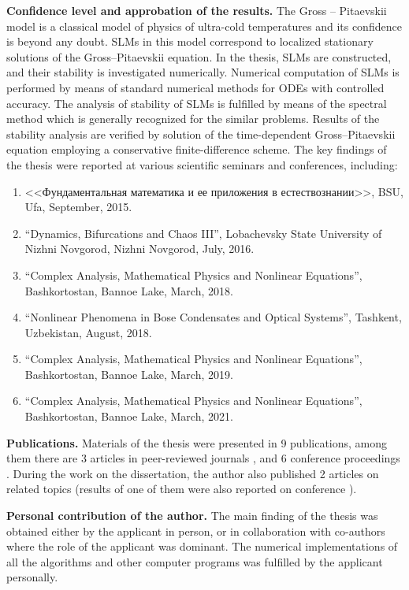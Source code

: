 \textbf{Confidence level and approbation of the results.}
The Gross -- Pitaevskii model is a classical model of physics of ultra-cold temperatures and its confidence is beyond any doubt.
SLMs in this model correspond to localized stationary solutions of the Gross--Pitaevskii equation.
In the thesis, SLMs are constructed, and their stability is investigated numerically.
Numerical computation of SLMs is performed by means of standard numerical methods for ODEs with controlled accuracy.
The analysis of stability of SLMs is fulfilled by means of the spectral method which is generally recognized for the similar problems.
Results of the stability analysis are verified by solution of the time-dependent Gross--Pitaevskii equation employing a conservative finite-difference scheme.
The key findings of the thesis were reported at various scientific seminars and conferences, including:
\begin{enumerate}
	\item <<Фундаментальная математика и ее приложения в естествознании>>, BSU, Ufa, September, 2015.
	\item ``Dynamics, Bifurcations and Chaos III'', Lobachevsky State University of Nizhni Novgorod, Nizhni Novgorod, July, 2016.
	\item ``Complex Analysis, Mathematical Physics and Nonlinear Equations'', Bashkortostan, Bannoe Lake, March, 2018.
	\item ``Nonlinear Phenomena in Bose Condensates and Optical Systems'', Tashkent, Uzbekistan, August, 2018.
	\item ``Complex Analysis, Mathematical Physics and Nonlinear Equations'', Bashkortostan, Bannoe Lake, March, 2019.
	\item ``Complex Analysis, Mathematical Physics and Nonlinear Equations'', Bashkortostan, Bannoe Lake, March, 2021.
\end{enumerate}

\textbf{Publications.}
Materials of the thesis were presented in 9 publications, among them there are 3 articles in peer-reviewed journals \cite{AlfimovLebedev, LebedevAlfimovMalomed, AlfimovGegelLebedevMalomedZezyulin}, and 6 conference proceedings \cite{Ufa2015, NizhniNovgorod2016, Bannoe2018, Tashkent2018, LebedevShipitsynBannoe2019, Bannoe2021}.
During the work on the dissertation, the author also published 2 articles \cite{LebedevDolininaHong, ZezyulinLebedevAlfimovMalomed} on related topics (results of one of them were also reported on conference \cite{LebedevAlfimovBannoe2019}).

\textbf{Personal contribution of the author.}
The main finding of the thesis was obtained either by the applicant in person, or in collaboration with co-authors where the role of the applicant was dominant.
The numerical implementations of all the algorithms and other computer programs was fulfilled by the applicant personally.

